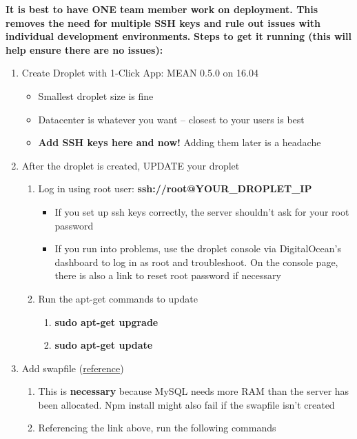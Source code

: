 \documentclass{article}
\begin{document}
\textbf{It is best to have ONE team member work on deployment. This removes the need for multiple SSH keys and rule out issues with individual development environments.}
\textbf{Steps to get it running (this will help ensure there are no issues):}
\begin{enumerate}
  \item Create Droplet with 1-Click App: MEAN 0.5.0 on 16.04
  \begin{itemize}
    \item Smallest droplet size is fine
    \item Datacenter is whatever you want -- closest to your users is best
    \item \textbf{Add SSH keys here and now!} Adding them later is a headache
  \end{itemize}
  \item After the droplet is created, UPDATE your droplet
  \begin{enumerate}
    \item Log in using root user: \textbf{ssh://root@YOUR\_DROPLET\_IP}
    \begin{itemize}
      \item If you set up ssh keys correctly, the server shouldn't ask for your root password
      \item If you run into problems, use the droplet console via DigitalOcean's dashboard to log in as root and troubleshoot. On the console page, there is also a link to reset root password if necessary
    \end{itemize}
    \item Run the apt-get commands to update
    \begin{enumerate}
      \item \textbf{sudo apt-get upgrade}
      \item \textbf{sudo apt-get update}
    \end{enumerate}
  \end{enumerate}
  \item Add swapfile (\href{https://www.digitalocean.com/community/tutorials/how-to-add-swap-on-ubuntu-14-04}{reference})
  \begin{enumerate}
    \item This is \textbf{necessary} because MySQL needs more RAM than the server has been allocated. Npm install might also fail if the swapfile isn't created
    \item Referencing the link above, run the following commands
    \begin{enumerate}

\end{enumerate}
\end{enumerate}
\end{enumerate}
\end{document}
